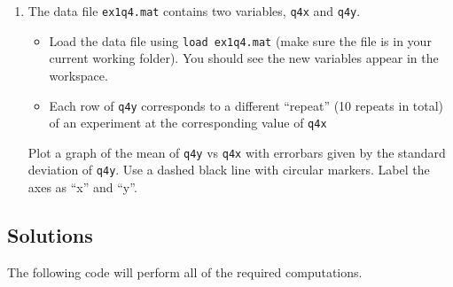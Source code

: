 \documentclass[12pt,a4paper]{tufte-handout}
\begin{document}
\begin{enumerate}
  \item The data file \texttt{ex1q4.mat} contains two variables, \texttt{q4x} and \texttt{q4y}.
    \begin{itemize}
      \item Load the data file using \texttt{load ex1q4.mat} (make sure the file is in your current working folder). You should see the new variables appear in the workspace.
      \item Each row of \texttt{q4y} corresponds to a different ``repeat'' (10 repeats in total) of an experiment at the corresponding value of \texttt{q4x}
    \end{itemize}
    Plot a graph of the mean of \texttt{q4y} vs \texttt{q4x} with errorbars given by the standard deviation of \texttt{q4y}. Use a dashed black line with circular markers. Label the axes as ``x'' and ``y''.

\end{enumerate}

\begin{Solutions}
  \section*{Solutions}
  The following code will perform all of the required computations.
  
\end{Solutions}
\end{document}

